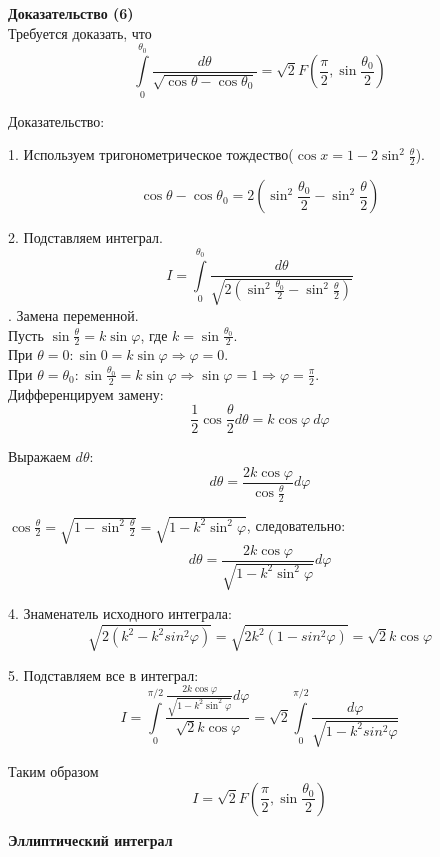 \documentclass{beamer}
\begin{document}
	\large \textbf{\textcolor{structure.fg}{Доказательство (6)}}\\
	
	Требуется доказать, что
	\[\int\limits_0^{\theta_0}\frac{d\theta}{\sqrt{\cos{\theta}-\cos{\theta_0}}}=\sqrt{2}F\left(\frac{\pi}{2}, \sin{\frac{\theta_0}{2}}\right)\]
	
	Доказательство:
	
	1. Используем тригонометрическое тождество(\(\cos{x}=1-2\sin^2{\frac{\theta}{2}}\)).
	
	\[\cos{\theta}-\cos{\theta_0}=2\left(\sin^2{\frac{\theta_0}{2}}-\sin^2{\frac{\theta}{2}}\right)\]
	
	2. Подставляем интеграл.
	\[I=\int\limits_0^{\theta_0}\frac{d\theta}{\sqrt{2(\sin^2\frac{\theta_0}{2}-\sin^2\frac{\theta}{2})}}\]
	. Замена переменной.\\
	Пусть \(\sin\frac{\theta}{2}=k\sin{\varphi}\), где \(k=\sin\frac{\theta_0}{2}\).\\
	При \(\theta=0: \sin{0}=k\sin\varphi\Rightarrow\varphi=0\).\\
	При \(\theta=\theta_0: \sin{\frac{\theta_0}{2}}=k\sin\varphi\Rightarrow\sin\varphi=1\Rightarrow\varphi=\frac{\pi}{2}\).\\
	
	Дифференцируем замену:\\
	\[\frac{1}{2}\cos\frac{\theta}{2}d\theta=k\cos\varphi\ d\varphi\]
	
	Выражаем \(d\theta\):\\
	\[d\theta=\frac{2k\cos\varphi}{\cos\frac{\theta}{2}}d\varphi\]
	
	\(\cos\frac{\theta}{2}=\sqrt{1-\sin^2\frac{\theta}{2}}=\sqrt{1-k^2\sin^2\varphi}\), следовательно:
	\[d\theta=\frac{2k\cos\varphi}{\sqrt{1-k^2\sin^2\varphi}}d\varphi\]
	\newpage
	
	4. Знаменатель исходного интеграла:
	\[\sqrt{2(k^2-k^2sin^2\varphi)}=\sqrt{2k^2(1-sin^2\varphi)}=\sqrt{2}k \cos\varphi\]
	
	5. Подставляем все в интеграл:
	\[I=\int\limits_0^{\pi/2}\frac{\frac{2k \cos\varphi}{\sqrt{1-k^2\sin^2\varphi}}d\varphi}{\sqrt{2}k \cos\varphi}=\sqrt{2}\int\limits_0^{\pi/2}\frac{d\varphi}{\sqrt{1-k^2sin^2\varphi}}\]
	
	Таким образом \[I=\sqrt{2}F\left(\frac{\pi}{2},\sin\frac{\theta_0}{2}\right)\]
	
	\newpage
	
	\large \textbf{\textcolor{structure.fg}{Эллиптический интеграл}}\\
	
\end{document}
